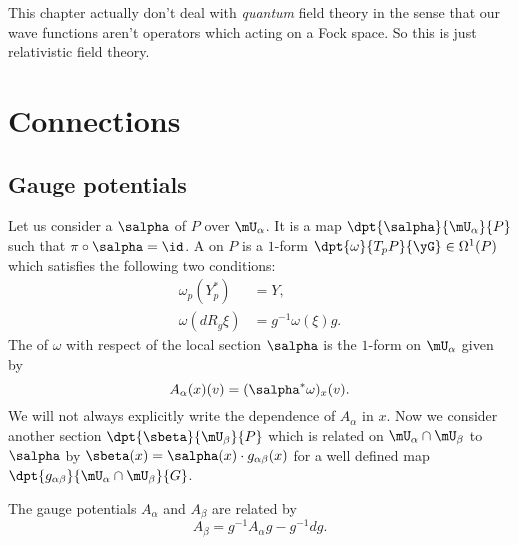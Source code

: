 This chapter actually don't deal with \emph{quantum} field theory in the sense that our wave functions aren't operators which acting on a Fock space. So this is just relativistic field theory. 

\section{Connections}

\subsection{Gauge potentials}

Let us consider a  $\salpha$ of $P$ over $\mU_{\alpha}$. It is a map $\dpt{\salpha}{\mU_{\alpha}}{P}$ such that $\pi\circ\salpha=\id$. A  on $P$ is a $1$-form $\dpt{\omega}{T_pP}{\yG}\in\Omega^1(P)$ which satisfies the following two conditions:
\begin{subequations}
\begin{align}
   \omega_p(Y^*_p)&=Y,   \label{conn_1}\\
   \omega(dR_g\xi)&=g^{-1}\omega(\xi)g.\label{conn_2}
\end{align}
\end{subequations}
The  of $\omega$ with respect of the local section\label{PgLocSecConn} $\salpha$ is  the $1$-form on $\mU_{\alpha}$ given by
\begin{equation}
          A_{\alpha}(x)(v)=(\salpha^*\omega)_x(v).
\end{equation}
We will not always explicitly write the dependence of $A_{\alpha}$ in $x$. Now we consider another section $\dpt{\sbeta}{\mU_{\beta}}{P}$ which is related on $\mU_{\alpha}\cap\mU_{\beta}$ to $\salpha$ by $\sbeta(x)=\salpha(x)\cdot g_{\alpha\beta}(x)$ for a well defined map $\dpt{g_{\alpha\beta}}{\mU_{\alpha}\cap\mU_{\beta}}{G}$.

\begin{proposition}
The gauge potentials $A_{\alpha}$ and $A_{\beta}$ are related by
\begin{equation}\label{trans_A}
                A_{\beta}=g^{-1} A_{\alpha} g-g^{-1} dg.
\end{equation}
\label{prop:trans_A}
\end{proposition}

